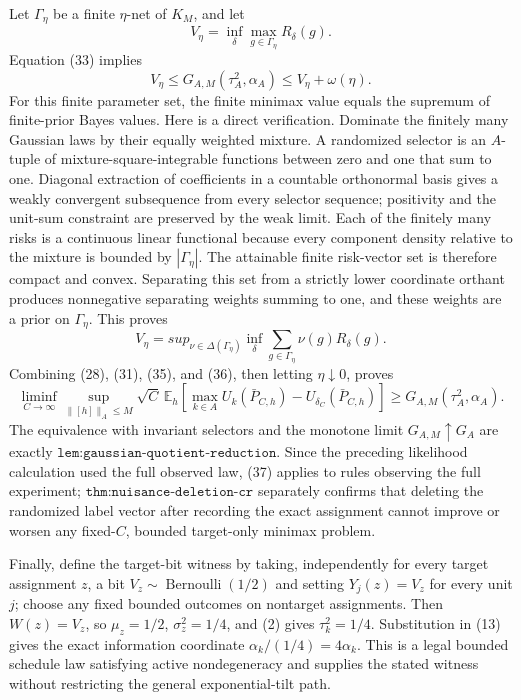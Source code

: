 Let \(\Gamma_\eta\) be a finite \(\eta\)-net of \(K_M\), and let
\[
V_\eta=\inf_\delta\max_{g\in\Gamma_\eta}R_\delta(g).
\tag{34}
\]
Equation (33) implies
\[
V_\eta\leq G_{A,M}(\tau_A^2,\alpha_A)
\leq V_\eta+\omega(\eta).
\tag{35}
\]
For this finite parameter set, the finite minimax value equals the supremum of finite-prior Bayes values.  Here is a direct verification.  Dominate the finitely many Gaussian laws by their equally weighted mixture.  A randomized selector is an \(A\)-tuple of mixture-square-integrable functions between zero and one that sum to one.  Diagonal extraction of coefficients in a countable orthonormal basis gives a weakly convergent subsequence from every selector sequence; positivity and the unit-sum constraint are preserved by the weak limit.  Each of the finitely many risks is a continuous linear functional because every component density relative to the mixture is bounded by \(|\Gamma_\eta|\).  The attainable finite risk-vector set is therefore compact and convex.  Separating this set from a strictly lower coordinate orthant produces nonnegative separating weights summing to one, and these weights are a prior on \(\Gamma_\eta\).  This proves
\[
V_\eta=sup_{\nu\in\Delta(\Gamma_\eta)}
\inf_\delta\sum_{g\in\Gamma_\eta}\nu(g)R_\delta(g).
\tag{36}
\]
Combining (28), (31), (35), and (36), then letting \(\eta\downarrow0\), proves
\[
\liminf_{C\to\infty}\sup_{\lVert[h]\rVert_A\leq M}
\sqrt C\,\mathbb E_h\!\left[
\max_{k\in A}U_k(\bar P_{C,h})-U_{\delta_C}(\bar P_{C,h})
\right]
\geq G_{A,M}(\tau_A^2,\alpha_A).
\tag{37}
\]
The equivalence with invariant selectors and the monotone limit \(G_{A,M}\uparrow G_A\) are exactly \(\texttt{lem:gaussian-quotient-reduction}\).  Since the preceding likelihood calculation used the full observed law, (37) applies to rules observing the full experiment; \(\texttt{thm:nuisance-deletion-cr}\) separately confirms that deleting the randomized label vector after recording the exact assignment cannot improve or worsen any fixed-\(C\), bounded target-only minimax problem.

Finally, define the target-bit witness by taking, independently for every target assignment \(z\), a bit \(V_z\sim\operatorname{Bernoulli}(1/2)\) and setting \(Y_j(z)=V_z\) for every unit \(j\); choose any fixed bounded outcomes on nontarget assignments.  Then \(W(z)=V_z\), so \(\mu_z=1/2\), \(\sigma_z^2=1/4\), and (2) gives \(\tau_k^2=1/4\).  Substitution in (13) gives the exact information coordinate \(\alpha_k/(1/4)=4\alpha_k\).  This is a legal bounded schedule law satisfying active nondegeneracy and supplies the stated witness without restricting the general exponential-tilt path.